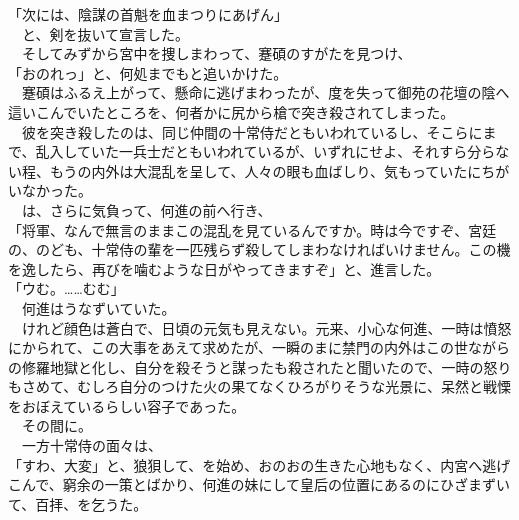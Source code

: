 \documentclass[
  paper=a5,
  fontsize=10pt,
  jafontsize=9.5pt,
  tate,                  %
  open_bracket_pos=nibu, %
]{jlreq}
\begin{document}
「次には、陰謀の首魁を血まつりにあげん」\\


　と、剣を抜いて宣言した。\\


　そしてみずから宮中を捜しまわって、蹇碩のすがたを見つけ、\\


「おのれっ」と、何処までもと追いかけた。\\


　蹇碩はふるえ上がって、懸命に逃げまわったが、度を失って御苑の花壇の陰へ這いこんでいたところを、何者かに尻から槍で突き殺されてしまった。\\


　彼を突き殺したのは、同じ仲間の十常侍だともいわれているし、そこらにまで、乱入していた一兵士だともいわれているが、いずれにせよ、それすら分らない程、もうの内外は大混乱を呈して、人々の眼も血ばしり、気もっていたにちがいなかった。\\


　は、さらに気負って、何進の前へ行き、\\


「将軍、なんで無言のままこの混乱を見ているんですか。時は今ですぞ、宮廷の、のども、十常侍の輩を一匹残らず殺してしまわなければいけません。この機を逸したら、再びを噛むような日がやってきますぞ」と、進言した。\\


「ウむ。……むむ」\\


　何進はうなずいていた。\\


　けれど顔色は蒼白で、日頃の元気も見えない。元来、小心な何進、一時は憤怒にかられて、この大事をあえて求めたが、一瞬のまに禁門の内外はこの世ながらの修羅地獄と化し、自分を殺そうと謀ったも殺されたと聞いたので、一時の怒りもさめて、むしろ自分のつけた火の果てなくひろがりそうな光景に、呆然と戦慄をおぼえているらしい容子であった。\\


　その間に。\\


　一方十常侍の面々は、\\


「すわ、大変」と、狼狽して、を始め、おのおの生きた心地もなく、内宮へ逃げこんで、窮余の一策とばかり、何進の妹にして皇后の位置にあるのにひざまずいて、百拝、を乞うた。\\
\end{document}
